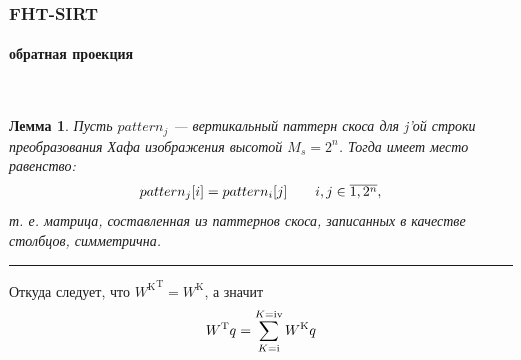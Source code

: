 \documentclass[12pt]{beamer}
\newcommand{\rom}[1]{%
  \textup{\uppercase\expandafter{\romannumeral#1}}%
}
\begin{document}
\begin{frame}
\frametitle{FHT-SIRT}
\framesubtitle{обратная проекция}

\begingroup
\small
\vspace{-0.5cm}
\newtheorem{myth}{Лемма}\
\begin{myth}
Пусть $pattern_j$ --- вертикальный паттерн скоса для j'ой строки преобразования Хафа изображения высотой $M_s = 2^n$.
Тогда имеет место равенство:
\begin{equation} \notag
\label{statement1}
\begin{array}{l l}
pattern_j[i] = pattern_i[j] & \quad  i,j \in \overline{1, 2^n},
\end{array}
\end{equation}
т. е. матрица, составленная из паттернов скоса, записанных в качестве столбцов, симметрична.
\end{myth}
\endgroup
\noindent\rule{8cm}{0.4pt}
\vspace{0.3cm}

Откуда следует, что ${W^{\mathrm K}} ^ {\mathrm T} = W^{\mathrm K}$, а значит
$$
W^{\mathrm T} q = \sum_{K=\rom{1}}^{K=\rom{4}}{W^{\mathrm K} q}
$$

\end{frame}
\end{document}
